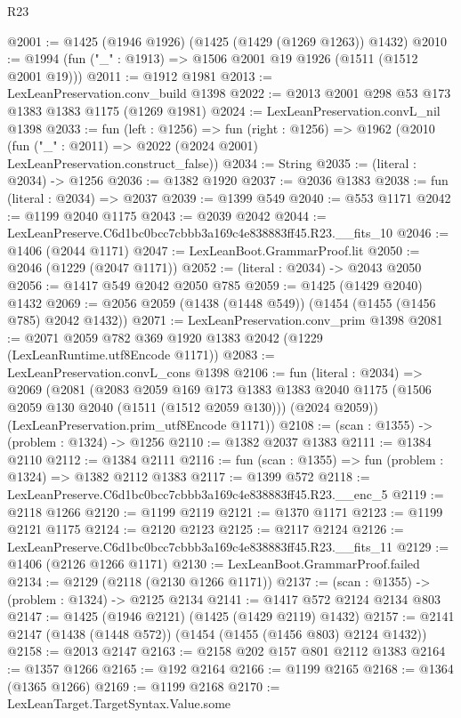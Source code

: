 \begin{lexlean}{R23}
\begin{coremodule}
@2001 := @1425 (@1946 @1926) (@1425 (@1429 (@1269 @1263)) @1432)
@2010 := @1994 (fun ("_" : @1913) => @1506 @2001 @19 @1926 (@1511 (@1512 @2001 @19)))
@2011 := @1912 @1981
@2013 := LexLeanPreservation.conv_build @1398
@2022 := @2013 @2001 @298 @53 @173 @1383 @1383 @1175 (@1269 @1981)
@2024 := LexLeanPreservation.convL_nil @1398
@2033 := fun (left : @1256) =>
  fun (right : @1256) =>
  @1962 (@2010 (fun ("_" : @2011) => @2022 (@2024 @2001) LexLeanPreservation.construct_false))
@2034 := String
@2035 := (literal : @2034) -> @1256
@2036 := @1382 @1920
@2037 := @2036 @1383
@2038 := fun (literal : @2034) => @2037
@2039 := @1399 @549
@2040 := @553 @1171
@2042 := @1199 @2040 @1175
@2043 := @2039 @2042
@2044 := LexLeanPreserve.C6d1bc0bcc7cbbb3a169c4e838883ff45.R23.__fits_10
@2046 := @1406 (@2044 @1171)
@2047 := LexLeanBoot.GrammarProof.lit
@2050 := @2046 (@1229 (@2047 @1171))
@2052 := (literal : @2034) -> @2043 @2050
@2056 := @1417 @549 @2042 @2050 @785
@2059 := @1425 (@1429 @2040) @1432
@2069 := @2056 @2059 (@1438 (@1448 @549)) (@1454 (@1455 (@1456 @785) @2042 @1432))
@2071 := LexLeanPreservation.conv_prim @1398
@2081 := @2071 @2059 @782 @369 @1920 @1383 @2042 (@1229 (LexLeanRuntime.utf8Encode @1171))
@2083 := LexLeanPreservation.convL_cons @1398
@2106 := fun (literal : @2034) =>
  @2069
    (@2081
      (@2083
        @2059
        @169
        @173
        @1383
        @1383
        @2040
        @1175
        (@1506 @2059 @130 @2040 (@1511 (@1512 @2059 @130)))
        (@2024 @2059))
      (LexLeanPreservation.prim_utf8Encode @1171))
@2108 := (scan : @1355) -> (problem : @1324) -> @1256
@2110 := @1382 @2037 @1383
@2111 := @1384 @2110
@2112 := @1384 @2111
@2116 := fun (scan : @1355) => fun (problem : @1324) => @1382 @2112 @1383
@2117 := @1399 @572
@2118 := LexLeanPreserve.C6d1bc0bcc7cbbb3a169c4e838883ff45.R23.__enc_5
@2119 := @2118 @1266
@2120 := @1199 @2119
@2121 := @1370 @1171
@2123 := @1199 @2121 @1175
@2124 := @2120 @2123
@2125 := @2117 @2124
@2126 := LexLeanPreserve.C6d1bc0bcc7cbbb3a169c4e838883ff45.R23.__fits_11
@2129 := @1406 (@2126 @1266 @1171)
@2130 := LexLeanBoot.GrammarProof.failed
@2134 := @2129 (@2118 (@2130 @1266 @1171))
@2137 := (scan : @1355) -> (problem : @1324) -> @2125 @2134
@2141 := @1417 @572 @2124 @2134 @803
@2147 := @1425 (@1946 @2121) (@1425 (@1429 @2119) @1432)
@2157 := @2141 @2147 (@1438 (@1448 @572)) (@1454 (@1455 (@1456 @803) @2124 @1432))
@2158 := @2013 @2147
@2163 := @2158 @202 @157 @801 @2112 @1383
@2164 := @1357 @1266
@2165 := @192 @2164
@2166 := @1199 @2165
@2168 := @1364 (@1365 @1266)
@2169 := @1199 @2168
@2170 := LexLeanTarget.TargetSyntax.Value.some

\end{coremodule}
\end{lexlean}

